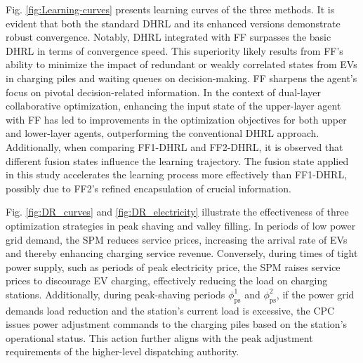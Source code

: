 \documentclass[preprint,12pt]{elsarticle}
\begin{document}
Fig. \ref{fig:Learning-curves} presents learning curves of the three methods.  It is evident that both the standard DHRL and its enhanced versions demonstrate robust convergence.  Notably, DHRL integrated with FF surpasses the basic DHRL in terms of convergence speed.  This superiority likely results from FF's ability to minimize the impact of redundant or weakly correlated states from EVs in charging piles and waiting queues on decision-making.  FF sharpens the agent's focus on pivotal decision-related information.  In the context of dual-layer collaborative optimization, enhancing the input state of the upper-layer agent with FF has led to improvements in the optimization objectives for both upper and lower-layer agents, outperforming the conventional DHRL approach.  Additionally, when comparing FF1-DHRL and FF2-DHRL, it is observed that different fusion states influence the learning trajectory.  The fusion state applied in this study accelerates the learning process more effectively than FF1-DHRL, possibly due to FF2's refined encapsulation of crucial information. 


Fig. \ref{fig:DR_curves} and \ref{fig:DR_electricity} illustrate the effectiveness of three optimization strategies in peak shaving and valley filling.  In periods of low power grid demand, the SPM reduces service prices, increasing the arrival rate of EVs and thereby enhancing charging service revenue.  Conversely, during times of tight power supply, such as periods of peak electricity price, the SPM raises service prices to discourage EV charging, effectively reducing the load on charging stations.  Additionally, during peak-shaving periods  $\phi_\textrm{ps}^{1}$ and $\phi_\textrm{ps}^{2}$, if the power grid demands load reduction and the station's current load is excessive, the CPC issues power adjustment commands to the charging piles based on the station's operational status. This action further aligns with the peak adjustment requirements of the higher-level dispatching authority. 
\end{document}
